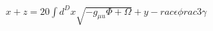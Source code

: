 \documentclass[preview]{standalone}
\begin{document}
\begin{align*}
x+ z= 20\int{d^{D}x}\sqrt{-g_{\mu
u} \Phi + \Omega}+ y - rac{\epsilon\phi}{rac{3}{\gamma}}
\end{align*}
\end{document}
